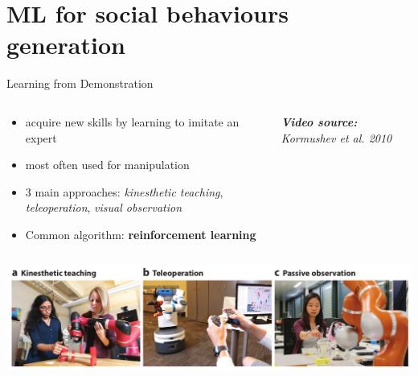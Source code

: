 \documentclass[compress,xcolor=table]{beamer}
\begin{document}


\section{ML for social behaviours generation}


{
\begin{frame}{Learning from Demonstration}
    \begin{columns}
        \begin{column}{0.5\linewidth}

            \begin{itemize}
                \item acquire new skills by learning to imitate an expert
                \item most often used for manipulation
                \item 3 main approaches: \emph{kinesthetic teaching},
                    \emph{teleoperation}, \emph{visual observation}
                \item Common algorithm: \textbf{reinforcement learning}
            \end{itemize}
        \end{column}
        \begin{column}{0.5\linewidth}

            {\tiny\it\textbf{Video source:} Kormushev et al. 2010}
        \end{column}
    \end{columns}

    \begin{center}
        \includegraphics[width=0.8\linewidth]{figs/generation/types-lfd-ravichandar-2020.png}
    \end{center}
\end{frame}
}
\end{document}
